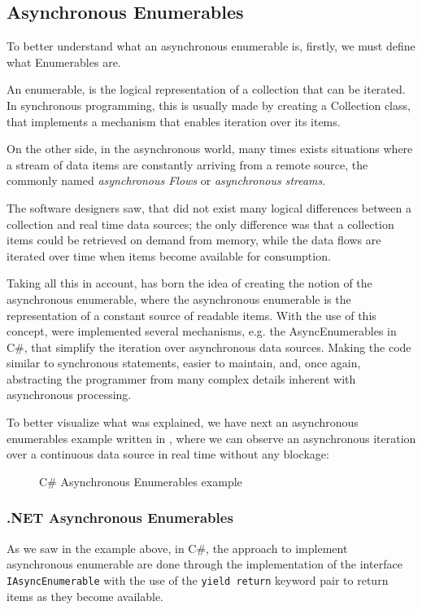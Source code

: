 \subsection{Asynchronous Enumerables}
	\label{sec:aenums}
	To better understand what an asynchronous enumerable is, firstly, we must define what Enumerables are. 
	
	An enumerable, is the logical representation of a collection that can be iterated. 
	In synchronous programming, this is usually made by creating a Collection class, that implements a mechanism that enables iteration over its items.
	
	On the other side, in the asynchronous world, many times exists situations where a stream of data items are constantly arriving from a remote source, the commonly named \textit{asynchronous Flows} or \textit{asynchronous streams}. 
	
	The software designers saw, that did not exist many logical differences between a collection and real time data sources; 
	the only difference was that a collection items could be retrieved on demand from memory, while the data flows are iterated over time when items become available for consumption.

	Taking all this in account, has born the idea of creating the notion of the asynchronous enumerable, where the asynchronous enumerable is the representation of a constant source of readable items.
	With the use of this concept, were implemented several mechanisms, e.g. the AsyncEnumerables in C\#, that simplify the iteration over asynchronous data sources. 
	Making the code similar to synchronous statements, easier to maintain, and, once again, abstracting the programmer from many complex details inherent with asynchronous processing.

	To better visualize what was explained, we have next an asynchronous enumerables example written in , where we can observe an asynchronous iteration over a continuous data source in real time without any blockage:
	\clearpage

	\begin{figure}[H]
		\centering
		\caption{C\# Asynchronous Enumerables example}
		\label{fig:enumex}
	\end{figure}
	
	\clearpage

\subsubsection{.NET Asynchronous Enumerables}
\label{csenums}
	As we saw in the example above, in C\#, the approach to implement asynchronous enumerable are done through the implementation of the interface \texttt{IAsyncEnumerable} with the use of the \texttt{yield return} keyword pair to return items as they become available.
	
